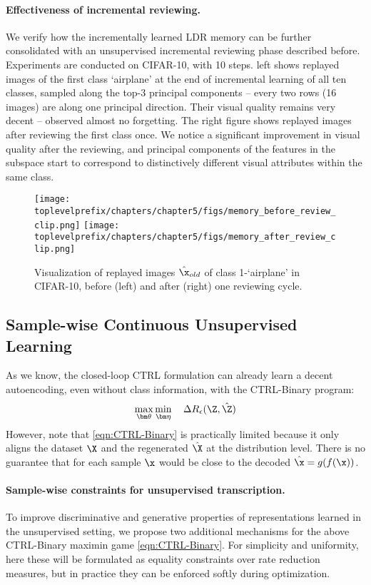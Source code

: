 \documentclass[../../book-main.tex]{subfiles}
\begin{document}
\paragraph{Effectiveness of incremental reviewing.}
We verify how the incrementally learned LDR memory can be further consolidated with an unsupervised incremental reviewing phase described before. Experiments are conducted on CIFAR-10, with 10 steps.  left shows replayed images of the first class `airplane' at the end of incremental learning of all ten classes, sampled along the top-3 principal components -- every two rows (16 images) are along one principal direction. Their  visual quality remains very decent -- observed almost no forgetting. The right figure shows replayed images after reviewing the first class once. We notice a significant improvement in visual quality after the reviewing, and principal components of the features in the subspace start to correspond to distinctively different visual attributes within the same class.

\begin{figure}
\centering
\texttt{[image: \\toplevelprefix/chapters/chapter5/figs/memory\_before\_review\_clip.png]}
\texttt{[image: \\toplevelprefix/chapters/chapter5/figs/memory\_after\_review\_clip.png]}
 \caption{\small Visualization of replayed images $\hat{\x}_{old}$ of class 1-`airplane' in CIFAR-10, before (left) and after (right) one reviewing cycle.} 
\label{fig:memory_review}
\end{figure}


\subsection{Sample-wise Continuous Unsupervised Learning}
\label{sec:sample-wise-incremental}

As we know, the closed-loop CTRL formulation can already learn a decent autoencoding, even without class information, with the  CTRL-Binary program:
\begin{align}
      \max_{\bm \theta} \min_{\bm \eta} \quad \Delta R_\epsilon(\Z, \hat{\Z}) 
 \label{eqn:CTRL-Binary}
\end{align}
However, note that \eqref{eqn:CTRL-Binary} is practically limited because it only aligns the dataset $\X$ and the regenerated $\hat \X$ at the distribution level. 
There is no guarantee that for each sample $\x$ would be close to the decoded $\hat \x = g(f(\x))$. 

\paragraph{Sample-wise constraints for unsupervised transcription.} 
\label{sec:constraints}
To improve discriminative and generative properties of representations learned in the unsupervised setting, we propose two additional mechanisms for the above CTRL-Binary maximin game \eqref{eqn:CTRL-Binary}.  For simplicity and uniformity, here these will be formulated as equality constraints over rate reduction measures, but in practice they can be enforced softly during optimization.
\end{document}
